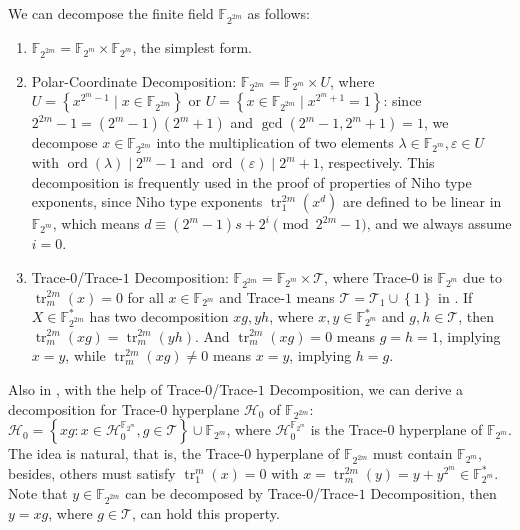 \documentclass[8pt,oneside]{article}
\newcommand{\0}{\textbf{0}}
\newcommand{\1}{\textbf{1}}
\newcommand{\F}{\mathbb{F}}
\newcommand{\ord}{\operatorname{ord}}
\begin{document}
    We can decompose the finite field $ \F_{2^{2m}} $ as follows:
    \begin{enumerate}[label=(\arabic{*})]
        \item $ \F_{2^{2m}}=\F_{2^m}\times\F_{2^m} $, the simplest form.
        \item Polar-Coordinate Decomposition: $ \F_{2^{2m}}=\F_{2^m}\times U $, 
        where $ U=\left\{ x^{2^m-1}\mid x\in\F_{2^{2m}}\right\} $ 
        or $ U=\left\{ x\in\F_{2^{2m}}\mid x^{2^m+1}=1 \right\} $: 
        since $ 2^{2m}-1=(2^m-1)(2^m+1) $ and $ \gcd(2^m-1,2^m+1)=1 $, 
        we decompose $ x\in\F_{2^{2m}} $ into the multiplication of two elements $ \lambda\in\F_{2^m},\varepsilon\in U $ 
        with $ \ord(\lambda)\mid 2^m-1 $ and $ \ord(\varepsilon)\mid 2^m+1 $, respectively. 
        This decomposition is frequently used in the proof of properties of Niho type exponents, 
        since Niho type exponents $ \operatorname{tr}_1^{2m}(x^d) $ are defined to be linear in $ \F_{2^m} $, 
        which means $ d\equiv (2^m-1)s+2^i\pmod{2^{2m}-1} $, and we always assume $ i=0 $. 
        \item Trace-$ 0 $/Trace-$ 1 $ Decomposition: $ \F_{2^{2m}}=\F_{2^m}\times\mathcal{T} $, 
        where Trace-$ 0 $ is $ \F_{2^m} $ due to $ \operatorname{tr}_m^{2m}(x)=0 $ for all $ x\in\F_{2^m} $ and 
        Trace-$ 1 $ means $ \mathcal{T}=\mathcal{T}_1\cup\left\{ 1 \right\} $ in \cite{gologlu2019proofconjecture}. 
        If $ X\in\F_{2^{2m}}^* $ has two decomposition $ xg,yh $, where $ x,y\in\F_{2^m}^* $ and $ g,h\in\mathcal{T} $, 
        then $ \operatorname{tr}_m^{2m}(xg)=\operatorname{tr}_m^{2m}(yh) $. And $ \operatorname{tr}_m^{2m}(xg)=0 $ means $ g=h=1 $, implying $ x=y $, while $ \operatorname{tr}_m^{2m}(xg)\ne 0 $ means $ x=y $, implying $ h=g $. 
    \end{enumerate} 
    Also in \cite{gologlu2019proofconjecture},  with the help of Trace-$ 0 $/Trace-$ 1 $ Decomposition, 
    we can derive a decomposition for Trace-$ 0 $ hyperplane $ \mathcal{H}_0 $ of $ \F_{2^{2m}} $: 
    $ \mathcal{H}_0=\left\{ xg:x\in\mathcal{H}_0^{\F_{2^m}},g\in\mathcal{T} \right\}\cup\F_{2^m} $, 
    where $ \mathcal{H}_0^{\F_{2^m}} $ is the Trace-$ 0 $ hyperplane of $ \F_{2^m} $. 
    The idea is natural, that is, the Trace-$ 0 $ hyperplane of $ \F_{2^{2m}} $ must contain $ \F_{2^m} $, 
    besides, others must satisfy $ \operatorname{tr}_1^m(x)=0 $ with $ x=\operatorname{tr}_m^{2m}(y)=y+y^{2^m}\in\F_{2^m}^* $. 
    Note that $ y\in\F_{2^{2m}} $ can be decomposed by Trace-$ 0 $/Trace-$ 1 $ Decomposition, then $ y=xg $,  
    where $ g\in\mathcal{T} $, can hold this property.
\end{document}
